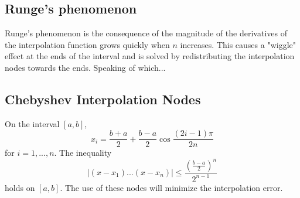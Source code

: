 \subsection{Runge's phenomenon}
Runge's phenomenon is the consequence of the magnitude of the derivatives of the interpolation function grows quickly when $n$ increases. This causes a "wiggle" effect at the ends of the interval and is solved by redistributing the interpolation nodes towards the ends. Speaking of which...

\subsection{Chebyshev Interpolation Nodes}
\begin{theorem}
On the interval $[a,b]$,
$$
x_i = \frac{b+a}{2} + \frac{b-a}{2}\cos{\frac{(2i-1)\pi}{2n}}
$$
for $i = 1, ..., n$. The inequality
$$
|(x-x_1)...(x-x_n)| \leq \frac{(\frac{b-a}{2})^n}{2^{n-1}}
$$
holds on $[a,b]$. The use of these nodes will minimize the interpolation error.
\end{theorem}